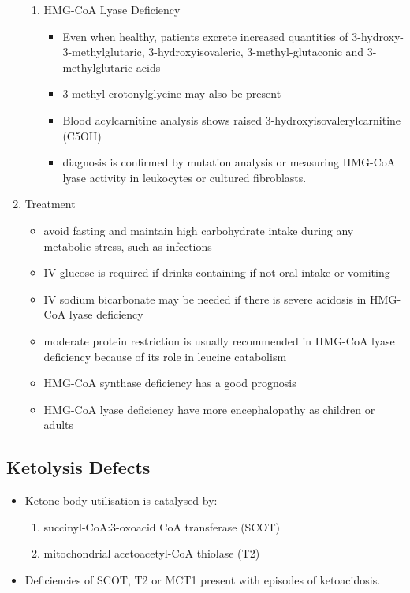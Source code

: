 \documentclass{scrartcl}
\begin{document}
\begin{enumerate}
\begin{enumerate}
\item HMG-CoA Lyase Deficiency
\label{sec:org6f0d34d}
\begin{itemize}
\item Even when healthy, patients excrete increased quantities of
3-hydroxy-3-methylglutaric, 3-hydroxyisovaleric, 3-methyl-glutaconic
and 3-methylglutaric acids
\item 3-methyl-crotonylglycine may also be present
\item Blood acylcarnitine analysis shows raised
3-hydroxyisovalerylcarnitine (C5OH)
\item diagnosis is confirmed by mutation analysis or measuring HMG-CoA
lyase activity in leukocytes or cultured fibroblasts.
\end{itemize}
\end{enumerate}

\item Treatment
\label{sec:org908cf86}
\begin{itemize}
\item avoid fasting and maintain  high carbohydrate intake during any
metabolic stress, such as infections
\item IV glucose is required if drinks containing if not oral intake or vomiting
\item IV sodium bicarbonate may be needed if there is severe acidosis in
HMG-CoA lyase deficiency
\item moderate protein restriction is usually recommended in HMG-CoA
lyase deficiency because of its role in leucine catabolism
\item HMG-CoA synthase deficiency has a good prognosis
\item HMG-CoA lyase deficiency have more encephalopathy as children or adults
\end{itemize}
\end{enumerate}

\subsection{Ketolysis Defects}
\label{sec:orga9416c1}
\begin{itemize}
\item Ketone body utilisation is catalysed by:
\begin{enumerate}
\item succinyl-CoA:3-oxoacid CoA transferase (SCOT)
\item mitochondrial acetoacetyl-CoA thiolase (T2)
\end{enumerate}
\item Deficiencies of SCOT, T2 or MCT1 present with episodes of ketoacidosis.
\end{itemize}
\end{document}
